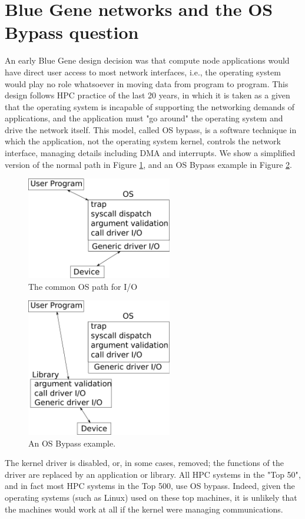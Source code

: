 \documentclass[letterpaper,twocolumn,10pt]{article}
\begin{document}
\section{Blue Gene networks and the OS Bypass question}
An early Blue Gene design decision was that  compute node applications would have direct user access to most network interfaces, i.e., the operating system would play no role whatsoever in moving data from program to program. This 
design follows HPC practice of the last 20 years, in which it is taken as a given that the operating system 
is incapable of supporting the networking demands of applications, and the application must "go around" the operating system and drive the network itself. This model, called OS bypass, is a software technique in which the application, not the operating system 
kernel, controls the network interface, managing details including DMA and interrupts. 
We show a simplified version of the normal path in Figure \ref{ospath}, and an OS Bypass example in Figure \ref{osbypass}.
\begin{figure}
\includegraphics[width=2.5in]{ospath}
\caption{\label{ospath}The common OS path for I/O}
\end{figure}
\begin{figure}
\includegraphics[width=2.5in]{osbypass}
\caption{\label{osbypass}An OS Bypass example.}
\end{figure}
The kernel driver is disabled, or, in some cases, removed; the functions of the driver are replaced by 
an application or library. 
All HPC systems in the "Top 50"\cite{top500}, and in fact most HPC systems in the Top 500, use OS bypass. Indeed, given the operating systems (such as Linux) 
used on these top machines, it is unlikely that the machines would work at all if the kernel were managing 
communications. 
\end{document}
